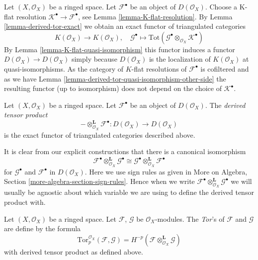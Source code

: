 \noindent
Let $(X, \mathcal{O}_X)$ be a ringed space.
Let $\mathcal{F}^\bullet$ be an object of $D(\mathcal{O}_X)$.
Choose a K-flat resolution $\mathcal{K}^\bullet \to \mathcal{F}^\bullet$, see
Lemma \ref{lemma-K-flat-resolution}.
By
Lemma \ref{lemma-derived-tor-exact}
we obtain an exact functor of triangulated categories
$$
K(\mathcal{O}_X)
\longrightarrow
K(\mathcal{O}_X),
\quad
\mathcal{G}^\bullet
\longmapsto
\text{Tot}(\mathcal{G}^\bullet \otimes_{\mathcal{O}_X} \mathcal{K}^\bullet)
$$
By
Lemma \ref{lemma-K-flat-quasi-isomorphism}
this functor induces a functor
$D(\mathcal{O}_X) \to D(\mathcal{O}_X)$ simply because
$D(\mathcal{O}_X)$ is the localization of $K(\mathcal{O}_X)$
at quasi-isomorphisms. As the category of $K$-flat resolutions
of $\mathcal{F}^\bullet$ is cofiltered and as we have
Lemma \ref{lemma-derived-tor-quasi-isomorphism-other-side}
the resulting functor (up to isomorphism)
does not depend on the choice of $\mathcal{K}^\bullet$.

\begin{definition}
\label{definition-derived-tor}
Let $(X, \mathcal{O}_X)$ be a ringed space.
Let $\mathcal{F}^\bullet$ be an object of $D(\mathcal{O}_X)$.
The {\it derived tensor product}
$$
- \otimes_{\mathcal{O}_X}^{\mathbf{L}} \mathcal{F}^\bullet :
D(\mathcal{O}_X)
\longrightarrow
D(\mathcal{O}_X)
$$
is the exact functor of triangulated categories described above.
\end{definition}

\noindent
It is clear from our explicit constructions that
there is a canonical isomorphism
$$
\mathcal{F}^\bullet \otimes_{\mathcal{O}_X}^{\mathbf{L}} \mathcal{G}^\bullet
\cong
\mathcal{G}^\bullet \otimes_{\mathcal{O}_X}^{\mathbf{L}} \mathcal{F}^\bullet
$$
for $\mathcal{G}^\bullet$ and $\mathcal{F}^\bullet$ in $D(\mathcal{O}_X)$.
Here we use sign rules as given in More on Algebra, Section
\ref{more-algebra-section-sign-rules}. Hence when we write
$\mathcal{F}^\bullet \otimes_{\mathcal{O}_X}^{\mathbf{L}} \mathcal{G}^\bullet$
we will usually be agnostic about which variable we are using to
define the derived tensor product with.

\begin{definition}
\label{definition-tor}
Let $(X, \mathcal{O}_X)$ be a ringed space.
Let $\mathcal{F}$, $\mathcal{G}$ be $\mathcal{O}_X$-modules.
The {\it Tor}'s of $\mathcal{F}$ and $\mathcal{G}$ are define by
the formula
$$
\text{Tor}_p^{\mathcal{O}_X}(\mathcal{F}, \mathcal{G}) =
H^{-p}(\mathcal{F} \otimes_{\mathcal{O}_X}^\mathbf{L} \mathcal{G})
$$
with derived tensor product as defined above.
\end{definition}


